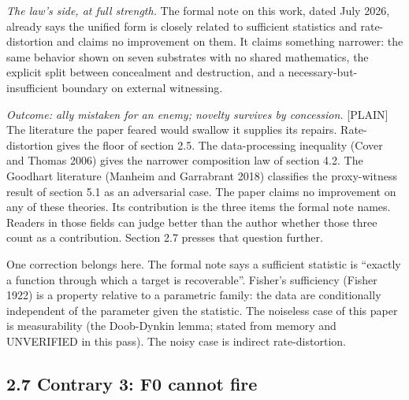 \documentclass[11pt]{article}
\newcommand{\register}[1]{{\ttfamily\small #1}}
\begin{document}
\emph{The law's side, at full strength.} The formal note on this work, dated July 2026, already says the unified form is closely related to sufficient statistics and rate-distortion and claims no improvement on them. It claims something narrower: the same behavior shown on seven substrates with no shared mathematics, the explicit split between concealment and destruction, and a necessary-but-insufficient boundary on external witnessing.

\emph{Outcome: ally mistaken for an enemy; novelty survives by concession.} \register{[PLAIN]} The literature the paper feared would swallow it supplies its repairs. Rate-distortion gives the floor of section 2.5. The data-processing inequality (Cover and Thomas 2006) gives the narrower composition law of section 4.2. The Goodhart literature (Manheim and Garrabrant 2018) classifies the proxy-witness result of section 5.1 as an adversarial case. The paper claims no improvement on any of these theories. Its contribution is the three items the formal note names. Readers in those fields can judge better than the author whether those three count as a contribution. Section 2.7 presses that question further.

One correction belongs here. The formal note says a sufficient statistic is ``exactly a function through which a target is recoverable''. Fisher's sufficiency (Fisher 1922) is a property relative to a parametric family: the data are conditionally independent of the parameter given the statistic. The noiseless case of this paper is measurability (the Doob-Dynkin lemma; stated from memory and UNVERIFIED in this pass). The noisy case is indirect rate-distortion.

\subsection*{2.7 Contrary 3: F0 cannot fire}
\end{document}
